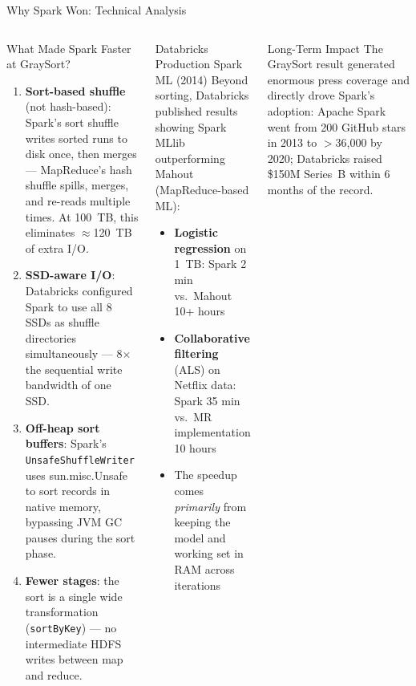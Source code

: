 \documentclass[aspectratio=169,10pt]{beamer}
\begin{document}
\begin{frame}{Why Spark Won: Technical Analysis}
  \begin{columns}[T]
      \begin{block}{What Made Spark Faster at GraySort?}
        \begin{enumerate}
          \item \textbf{Sort-based shuffle} (not hash-based):
                Spark's sort shuffle writes sorted runs to disk once,
                then merges — MapReduce's hash shuffle spills, merges,
                and re-reads multiple times.
                At 100~TB, this eliminates $\approx$120~TB of extra I/O.
          \item \textbf{SSD-aware I/O}: Databricks configured Spark to
                use all 8 SSDs as shuffle directories simultaneously —
                8$\times$ the sequential write bandwidth of one SSD.
          \item \textbf{Off-heap sort buffers}: Spark's \texttt{UnsafeShuffleWriter}
                uses sun.misc.Unsafe to sort records in native memory,
                bypassing JVM GC pauses during the sort phase.
          \item \textbf{Fewer stages}: the sort is a single wide
                transformation (\texttt{sortByKey}) — no intermediate
                HDFS writes between map and reduce.
        \end{enumerate}
      \end{block}

      \begin{exampleblock}{Databricks Production Spark ML (2014)}
        Beyond sorting, Databricks published results showing Spark
        MLlib outperforming Mahout (MapReduce-based ML):
        \begin{itemize}
          \item \textbf{Logistic regression} on 1~TB:
                Spark 2 min vs.\ Mahout 10+ hours
          \item \textbf{Collaborative filtering} (ALS) on Netflix data:
                Spark 35 min vs.\ MR implementation 10 hours
          \item The speedup comes \emph{primarily} from keeping the
                model and working set in RAM across iterations
        \end{itemize}
      \end{exampleblock}
      \vspace{4pt}
      \begin{block}{Long-Term Impact}
        The GraySort result generated enormous press coverage and
        directly drove Spark's adoption:
        Apache Spark went from 200 GitHub stars in 2013 to
        $>$36{,}000 by 2020;
        Databricks raised \$150M Series~B within 6 months of the record.
      \end{block}
  \end{columns}
\end{frame}
\end{document}
